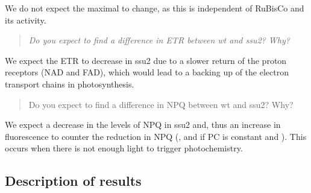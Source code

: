 \documentclass[
]{article}
\begin{document}
We do not expect the maximal {} to change, as this is independent of
RuBisCo and its activity.

\begin{quote}
\emph{Do you expect to find a difference in ETR between wt and ssu2?
Why?}
\end{quote}

We expect the ETR to decrease in ssu2 due to a slower return of the
proton receptors (NAD and FAD), which would lead to a backing up of the
electron transport chains in photosynthesis.

\begin{quote}
Do you expect to find a difference in NPQ between wt and ssu2? Why?
\end{quote}

We expect a decrease in the levels of NPQ in ssu2 and, thus an increase
in fluorescence to counter the reduction in NPQ ({}, and if PC is
constant and {}). This occurs when there is not enough light to trigger
photochemistry.

\subsection{Description of results}\label{description-of-results-1}
\end{document}
